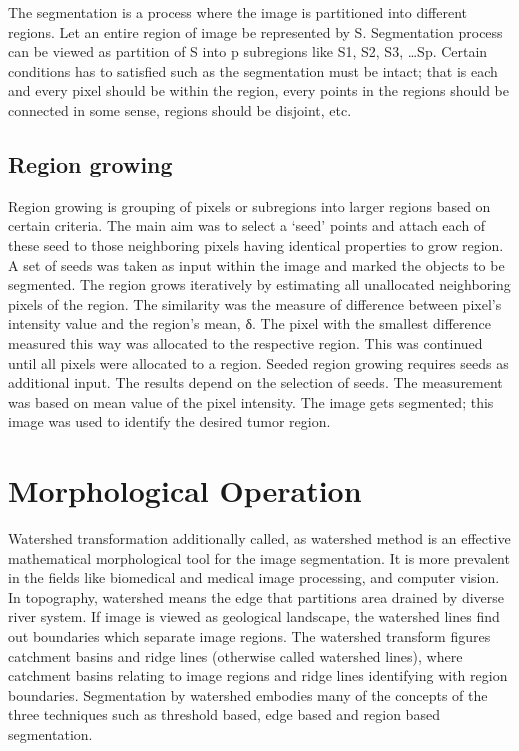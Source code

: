 The segmentation is a process where the image is partitioned into different regions. Let an entire region of image be represented by S. Segmentation process can be viewed as partition of S into p subregions like S1, S2, S3, …Sp. Certain conditions has to satisfied such as the segmentation must be intact; that is each and every pixel should be within the region, every points in the regions should be connected in some sense, regions should be disjoint, etc.

\subsection{Region growing}

Region growing is grouping of pixels or subregions into larger regions based on certain criteria. The main aim was to select a ‘seed’ points and attach each of these seed to those neighboring pixels having identical properties to grow region. A set of seeds was taken as input within the image and marked the objects to be segmented. The region grows iteratively by estimating all unallocated neighboring pixels of the region. The similarity was the measure of difference between pixel’s intensity value and the region’s mean, δ. The pixel with the smallest difference measured this way was allocated to the respective region. This was continued until all pixels were allocated to a region. Seeded region growing requires seeds as additional input. The results depend on the selection of seeds. The measurement was based on mean value of the pixel intensity. The image gets segmented; this image was used to identify the desired tumor region.

\section{Morphological Operation}

    Watershed transformation additionally called, as watershed method is an effective mathematical morphological tool for the image segmentation. It is more prevalent in the fields like biomedical and medical image processing, and computer vision. In topography, watershed means the edge that partitions area drained by diverse river system. If image is viewed as geological landscape, the watershed lines find out boundaries which separate image regions. The watershed transform figures catchment basins and ridge lines (otherwise called watershed lines), where catchment basins relating to image regions and ridge lines identifying with region boundaries. Segmentation by watershed embodies many of the concepts of the three techniques such as threshold based, edge based and region based segmentation.
    
